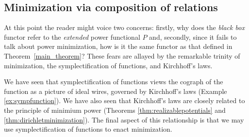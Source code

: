 \subsection{Minimization via composition of relations}

At this point the reader might voice two concerns: firstly, why does the
\emph{black box} functor refer to the \emph{extended} power functional $P$ and,
secondly, since it fails to talk about power minimization, how is it the same
functor as that defined in Theorem~\ref{main_theorem}? These fears are allayed
by the remarkable trinity of minimization, the symplectification of functions,
and Kirchhoff's laws. 

We have seen that symplectification of functions views the cograph of the
function as a picture of ideal wires, governed by Kirchhoff's laws (Example
\ref{ex:sympfunction}). We have also seen that Kirchhoff's laws are closely
related to the principle of minimium power (Theorems
\ref{thm:realizablepotentials} and \ref{thm:dirichletminimization}). The final
aspect of this relationship is that we may use symplectification of functions to
enact minimization.

